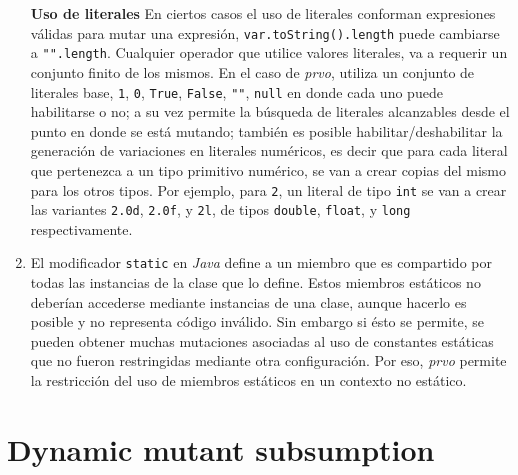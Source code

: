 \begin{enumerate}[leftmargin=.75cm,align=left]
	\item[\textbf{Uso de literales}] En ciertos casos el uso de literales conforman expresiones v\'alidas para mutar una expresi\'on, \lstinline|var.toString().length| puede cambiarse a \lstinline|"".length|. Cualquier operador que utilice valores literales, va a requerir un conjunto finito de los mismos. En el caso de \emph{prvo}, utiliza un conjunto de literales base, \lstinline|1|, \lstinline|0|, \lstinline|True|, \lstinline|False|, \lstinline|""|, \lstinline|null| en donde cada uno puede habilitarse o no; a su vez permite la b\'usqueda de literales alcanzables desde el punto en donde se est\'a mutando; tambi\'en es posible habilitar/deshabilitar la generaci\'on de variaciones en literales num\'ericos, es decir que para cada literal que pertenezca a un tipo primitivo num\'erico, se van a crear copias del mismo para los otros tipos. Por ejemplo, para \texttt{2}, un literal de tipo \texttt{int} se van a crear las variantes \texttt{2.0d}, \texttt{2.0f}, y \texttt{2l}, de tipos \lstinline{double}, \lstinline{float}, y \lstinline{long} respectivamente.
	
	\item[\textbf{Uso de campos est\'aticos}] El modificador \lstinline{static} en \emph{Java} define a un miembro que es compartido por todas las instancias de la clase que lo define. Estos miembros est\'aticos no deber\'ian accederse mediante instancias de una clase, aunque hacerlo es posible y no representa c\'odigo inv\'alido. Sin embargo si \'esto se permite, se pueden obtener muchas mutaciones asociadas al uso de constantes est\'aticas que no fueron restringidas mediante otra configuraci\'on. Por eso, \emph{prvo} permite la restricci\'on del uso de miembros est\'aticos en un contexto no est\'atico.
\end{enumerate}

\section{Dynamic mutant subsumption}
\label{sec:implementation.dynamicSubsumption}

